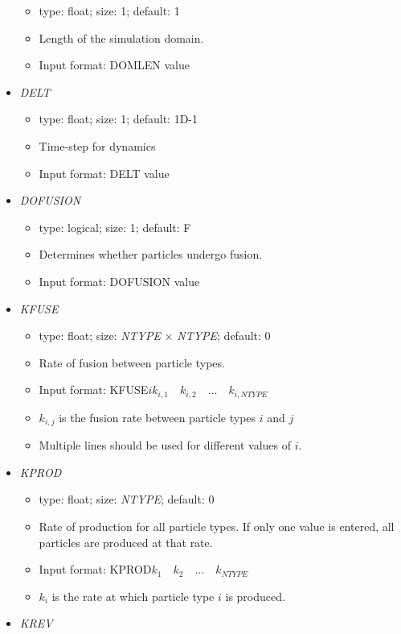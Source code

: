 \documentclass[12pt]{article}
\begin{document}
\begin{itemize}
\begin{itemize}
	 	\item  type: float; size: 1; default: 1
	 	\item Length of the simulation domain.
	 	\item Input format: DOMLEN value
	\end{itemize}
%
\item {\it DELT}
  \begin{itemize}
    \item  type: float; size: 1; default: 1D-1
    \item Time-step for dynamics
    \item Input format: DELT value
  \end{itemize}
%
\item {\it DOFUSION}
  \begin{itemize}
   	\item  type: logical; size: 1; default: F
   	\item Determines whether particles undergo fusion.
   	\item Input format: DOFUSION value
  \end{itemize}
%
\item {\it KFUSE}
	\begin{itemize}
		\item  type: float; size: \textit{NTYPE} $\times$ \textit{NTYPE}; default: 0
		\item Rate of fusion between particle types.
		\item Input format: KFUSE\quad$i$\quad$k_{i,1}\quad k_{i,2}\quad...\quad k_{i,NTYPE}$
		\item $k_{i,j}$ is the fusion rate between particle types $i$ and $j$
		\item Multiple lines should be used for different values of $i$.
	\end{itemize}
%
\item {\it KPROD}
	\begin{itemize}
		\item  type: float; size: \textit{NTYPE}; default: 0
		\item Rate of production for all particle types. If only one value is entered, all particles are produced at that rate. 
		\item Input format: KPROD\quad$k_{1}\quad k_{2}\quad...\quad k_{NTYPE}$
		\item $k_{i}$ is the rate at which particle type $i$ is produced.
	\end{itemize} 
%
\item {\it KREV}
	\begin{itemize}

\end{itemize}
\end{itemize}
\end{document}
